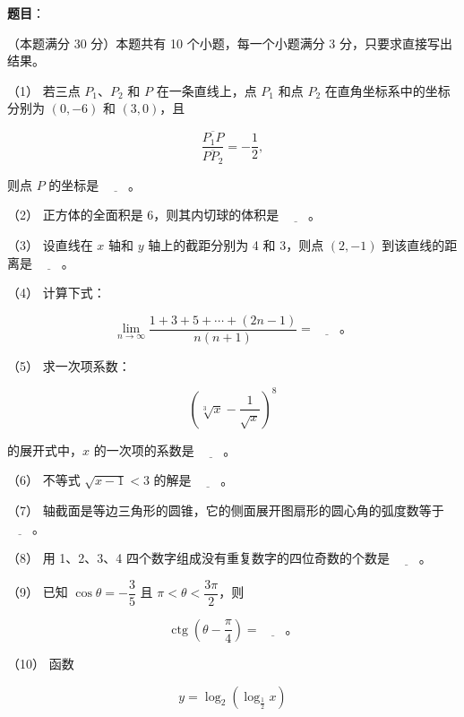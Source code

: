 \begin{answer}

\textbf{题目}：

（本题满分 30 分）本题共有 10 个小题，每一个小题满分 3 分，只要求直接写出结果。

（1） 若三点 $P_1\text{、}P_2$ 和 $P$ 在一条直线上，点 $P_1$ 和点 $P_2$ 在直角坐标系中的坐标分别为 $(0,-6)$ 和 $(3,0)$，且

\nopagebreak[4]
\[
\frac{\overline{P_1P}}{\overline{PP_2}}=-\frac12,
\]

则点 $P$ 的坐标是 $\underline{\hspace{2em}}$。

（2） 正方体的全面积是 6，则其内切球的体积是 $\underline{\hspace{2em}}$。

（3） 设直线在 $x$ 轴和 $y$ 轴上的截距分别为 4 和 3，则点 $(2,-1)$ 到该直线的距离是 $\underline{\hspace{2em}}$。

（4） 计算下式：

\nopagebreak[4]
\[
\lim_{n\to\infty}\frac{1+3+5+\cdots+(2n-1)}{n(n+1)}
=\underline{\hspace{2em}}\text{。}
\]

（5） 求一次项系数：

\nopagebreak[4]
\[
\left(\sqrt[3]{x}-\frac1{\sqrt{x}}\right)^8
\]

的展开式中，$x$ 的一次项的系数是 $\underline{\hspace{2em}}$。

（6） 不等式 $\sqrt{x-1}<3$ 的解是 $\underline{\hspace{2em}}$。

（7） 轴截面是等边三角形的圆锥，它的侧面展开图扇形的圆心角的弧度数等于 $\underline{\hspace{2em}}$。

（8） 用 1、2、3、4 四个数字组成没有重复数字的四位奇数的个数是 $\underline{\hspace{2em}}$。

（9） 已知 $\cos\theta=-\dfrac35$ 且 $\pi<\theta<\dfrac{3\pi}2$，则

\nopagebreak[4]
\[
\operatorname{ctg}\left(\theta-\frac\pi4\right)=\underline{\hspace{2em}}\text{。}
\]

（10） 函数

\nopagebreak[4]
\[
y=\log_2\left(\log_{\frac12}x\right)
\]


\end{answer}
